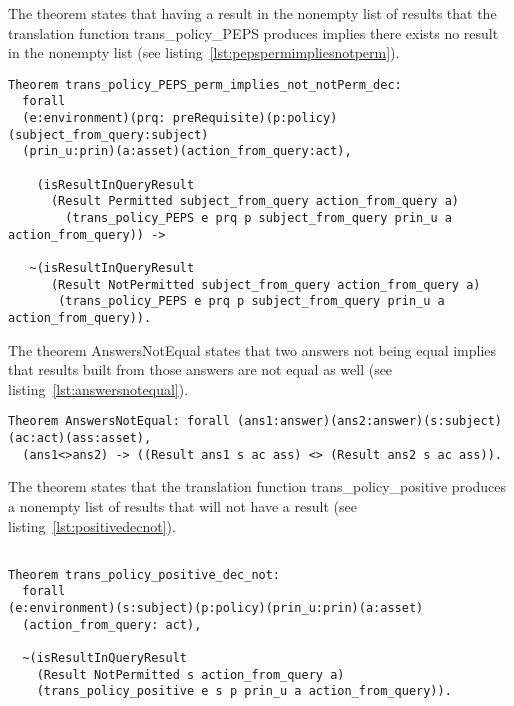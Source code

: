 The theorem  states that having a  result in the nonempty list of results that the translation function trans_policy_PEPS produces implies there exists no  result in the nonempty list (see listing~\ref{lst:pepspermimpliesnotperm}).

\begin{lstlisting}
Theorem trans_policy_PEPS_perm_implies_not_notPerm_dec:
  forall
  (e:environment)(prq: preRequisite)(p:policy)(subject_from_query:subject)
  (prin_u:prin)(a:asset)(action_from_query:act),

    (isResultInQueryResult 
      (Result Permitted subject_from_query action_from_query a)
        (trans_policy_PEPS e prq p subject_from_query prin_u a action_from_query)) ->

   ~(isResultInQueryResult 
      (Result NotPermitted subject_from_query action_from_query a)
       (trans_policy_PEPS e prq p subject_from_query prin_u a action_from_query)).

\end{lstlisting}
The theorem AnswersNotEqual states that two answers not being equal implies that results built from those answers are not equal as well (see listing~\ref{lst:answersnotequal}).

\begin{lstlisting}
Theorem AnswersNotEqual: forall (ans1:answer)(ans2:answer)(s:subject)(ac:act)(ass:asset),
  (ans1<>ans2) -> ((Result ans1 s ac ass) <> (Result ans2 s ac ass)).

\end{lstlisting}

The theorem  states that the translation function trans_policy_positive produces a nonempty list of results that will not have a  result (see listing~\ref{lst:positivedecnot}).


\begin{lstlisting}

Theorem trans_policy_positive_dec_not:
  forall 
(e:environment)(s:subject)(p:policy)(prin_u:prin)(a:asset)
  (action_from_query: act),
 
  ~(isResultInQueryResult 
    (Result NotPermitted s action_from_query a)
    (trans_policy_positive e s p prin_u a action_from_query)).
\end{lstlisting}

